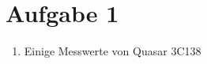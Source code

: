 \documentclass[11pt,a4paper]{scrartcl}
\begin{document}
\section*{Aufgabe 1}

\begin{enumerate}[label=\textbf{\large(\alph*)}]

\item
Einige Messwerte von Quasar 3C138

\end{enumerate}
\end{document}
